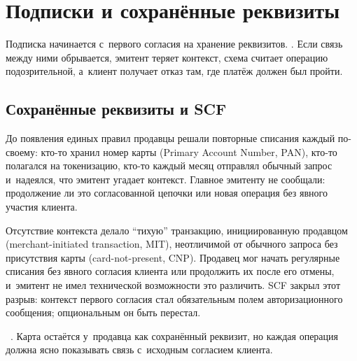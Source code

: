 
\chapter{Подписки и сохранённые реквизиты}\label{ch:subscriptions}
Подписка начинается с~первого согласия на хранение реквизитов. . Если связь между ними обрывается, эмитент теряет контекст,
схема считает операцию подозрительной, а~клиент получает отказ там,
где платёж должен был пройти.

\section{Сохранённые реквизиты и SCF}\label{sec:subscriptions-scf}

До появления единых правил продавцы решали повторные списания каждый
по-своему: кто-то хранил номер карты (Primary Account Number, PAN), кто-то полагался на токенизацию, кто-то
каждый месяц отправлял обычный запрос и~надеялся, что эмитент угадает
контекст. Главное эмитенту не сообщали: продолжение ли это
согласованной цепочки или новая операция без явного участия клиента.

Отсутствие контекста делало \enquote{тихую} транзакцию, инициированную продавцом (merchant-initiated transaction, MIT), неотличимой от обычного
запроса без присутствия карты (card-not-present, CNP). Продавец мог начать регулярные списания без явного
согласия клиента или продолжить их после его отмены, и~эмитент
не имел технической возможности это различить. SCF закрыл этот
разрыв: контекст первого согласия стал обязательным полем
авторизационного сообщения; опциональным он быть перестал.

~\cite{visa-scf,mc-tpr}. Карта остаётся
у~продавца как сохранённый реквизит, но каждая операция должна
ясно показывать связь с~исходным согласием клиента.

